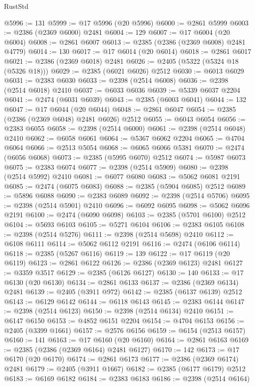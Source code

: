 \begin{lexlean}{RustStd}
\begin{coremodule}
{\begin{coremodule}
{{{{{{{{{{{{{{{{{{{{{{{{{{{{{{{{{{{{{{{{{{{{{{{{{{@5996 := 131
@5999 := @17 @5996 (@20 @5996)
@6000 := @2861 @5999
@6003 := @2386 (@2369 @6000) @2481
@6004 := 129
@6007 := @17 @6004 (@20 @6004)
@6008 := @2861 @6007
@6013 := @2385 (@2386 (@2369 @6008) @2481 @4779)
@6014 := 130
@6017 := @17 @6014 (@20 @6014)
@6018 := @2861 @6017
@6021 := @2386 (@2369 @6018) @2481
@6026 := @2405 (@5322 (@5324 @18 (@5326 @18)))
@6029 := @2385 (@6021 @6026) @2512
@6030 := @6013 @6029
@6031 := @2383 @6030
@6033 := @2398 (@2514 @6008)
@6036 := @2398 (@2514 @6018) @2410
@6037 := @6033 @6036
@6039 := @5339 @6037 @2204
@6041 := @2474 (@6031 @6039)
@6043 := @2385 (@6003 @6041)
@6044 := 132
@6047 := @17 @6044 (@20 @6044)
@6048 := @2861 @6047
@6054 := @2385 (@2386 (@2369 @6048) @2481 @6026) @2512
@6055 := @6043 @6054
@6056 := @2383 @6055
@6058 := @2398 (@2514 @6000)
@6061 := @2398 (@2514 @6048) @2410
@6062 := @6058 @6061
@6064 := @5367 @6062 @2204
@6065 := @4704 @6064
@6066 := @2513 @5054
@6068 := @6065 @6066 @5381
@6070 := @2474 (@6056 @6068)
@6073 := @2385 (@5995 @6070) @2512
@6074 := @5987 @6073
@6075 := @2383 @6074
@6077 := @2398 (@2514 @5909)
@6080 := @2398 (@2514 @5992) @2410
@6081 := @6077 @6080
@6083 := @5062 @6081 @2191
@6085 := @2474 (@6075 @6083)
@6088 := @2385 (@5904 @6085) @2512
@6089 := @5896 @6088
@6090 := @2383 @6089
@6092 := @2398 (@2514 @5706)
@6095 := @2398 (@2514 @5901) @2410
@6096 := @6092 @6095
@6098 := @5062 @6096 @2191
@6100 := @2474 (@6090 @6098)
@6103 := @2385 (@5701 @6100) @2512
@6104 := @5693 @6103
@6105 := @5271 @6104
@6106 := @2383 @6105
@6108 := @2398 (@2514 @5276)
@6111 := @2398 (@2514 @5698) @2410
@6112 := @6108 @6111
@6114 := @5062 @6112 @2191
@6116 := @2474 (@6106 @6114)
@6118 := @2385 (@5267 @6116)
@6119 := 139
@6122 := @17 @6119 (@20 @6119)
@6123 := @2861 @6122
@6126 := @2386 (@2369 @6123) @2481
@6127 := @3359 @3517
@6129 := @2385 (@6126 @6127)
@6130 := 140
@6133 := @17 @6130 (@20 @6130)
@6134 := @2861 @6133
@6137 := @2386 (@2369 @6134) @2481
@6139 := @2405 (@3911 @972)
@6142 := @2385 (@6137 @6139) @2512
@6143 := @6129 @6142
@6144 := @6118 @6143
@6145 := @2383 @6144
@6147 := @2398 (@2514 @6123)
@6150 := @2398 (@2514 @6134) @2410
@6151 := @6147 @6150
@6153 := @4852 @6151 @2204
@6154 := @4704 @6153
@6156 := @2405 (@3399 @1661)
@6157 := @2576 @6156
@6159 := @6154 (@2513 @6157)
@6160 := 141
@6163 := @17 @6160 (@20 @6160)
@6164 := @2861 @6163
@6169 := @2385 (@2386 (@2369 @6164) @2481 @6127)
@6170 := 142
@6173 := @17 @6170 (@20 @6170)
@6174 := @2861 @6173
@6177 := @2386 (@2369 @6174) @2481
@6179 := @2405 (@3911 @1667)
@6182 := @2385 (@6177 @6179) @2512
@6183 := @6169 @6182
@6184 := @2383 @6183
@6186 := @2398 (@2514 @6164)
}}}}}}}}}}}}}}}}}}}}}}}}}}}}}}}}}}}}}}}}}}}}}}}}}}
\end{coremodule}}
\end{coremodule}
\end{lexlean}
